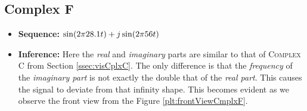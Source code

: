 \documentclass[../../course]{subfiles}
\begin{document}
\subsection{Complex F} \label{ssec:visCplxF}

\begin{itemize} [label=]

    \item \textbf{Sequence:} $\sin(2 \pi 28.1 t) + j \sin(2 \pi 56 t)$

    \item \textbf{Inference:} Here the \emph{real} and \emph{imaginary} parts are similar
        to that of \textsc{Complex C} from Section \ref{ssec:visCplxC}. The only difference
        is that the \emph{frequency} of the \emph{imaginary part} is not exactly the double
        that of the \emph{real part}. This causes the signal to deviate from that infinity shape.
        This becomes evident as we observe the front view from the Figure \ref{plt:frontViewCmplxF}.

\end{itemize}

\vfill
\end{document}

